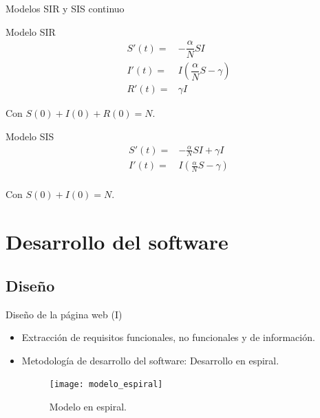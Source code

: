 \begin{frame}{Modelos SIR y SIS continuo}

    \begin{block}{Modelo SIR}
        \begin{equation}
            \label{eqn: modelo_SIR_continuo}
            \begin{aligned}
            S'(t) = & -\dfrac{\alpha}{N}SI \\
            I'(t) = & I\left(\dfrac{\alpha}{N}S-\gamma \right) \\
            R'(t) = & \gamma I
            \end{aligned}
            \end{equation}
            
            Con $S(0)+I(0)+R(0)=N$.
    \end{block}

    \pause

    \begin{block}{Modelo SIS}
        \begin{equation}
            \label{eqn: modelo_SIS_continuo}
            \begin{aligned}
            S'(t) = & -\frac{\alpha}{N}SI+\gamma I \\
            I'(t) = & I\left( \frac{\alpha}{N}S-\gamma \right) \\
            \end{aligned}
            \end{equation}
        
            Con $S(0)+I(0)=N$. 
        \end{block}
\end{frame}




\section{Desarrollo del software}


\subsection{Diseño}


\begin{frame}{Diseño de la página web (I)}

    \begin{itemize}
        \item Extracción de requisitos funcionales, no funcionales y de información.
        \item Metodología de desarrollo del software: Desarrollo en espiral.

        \begin{figure}
            \begin{center}
            \caption{Modelo en espiral.}
            \label{modelo_espiral}
            \texttt{[image: modelo\_espiral]}
            \end{center}
            \end{figure}
    \end{itemize}

\end{frame}

